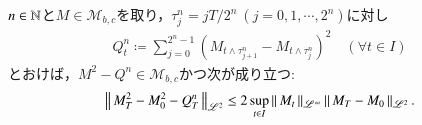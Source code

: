 	\begin{screen}
		\begin{lem}[二次変分補題]
			$n \in \mathbb{N}$と$M \in \mathcal{M}_{b,c}$を取り，$\tau_j^n = jT/2^n\ (j=0,1,\cdots,2^n)$に対し
			\begin{align}
				Q_t^n \coloneqq \sum_{j=0}^{2^n-1} \left( M_{t \wedge \tau_{j+1}^n} - M_{t \wedge \tau_j^n} \right)^2 \quad (\forall t \in I)
				\label{eq:lem_quadratic_variation_0}
			\end{align}
			とおけば，$M^2 - Q^n \in \mathcal{M}_{b,c}$かつ次が成り立つ:
			\begin{align}
				\left\|\, M_T^2 - M_0^2 - Q_T^n\, \right\|_{\mathscr{L}^2} \leq 2 \operatorname*{sup}_{t \in I} \left\|\, M_t\, \right\|_{\mathscr{L}^\infty} \left\|\, M_T - M_0\, \right\|_{\mathscr{L}^2}.
			\end{align}
			\label{lem:quadratic_variation}
		\end{lem}
	\end{screen}
	
